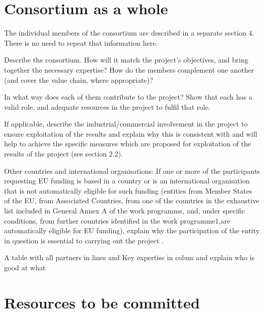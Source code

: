 

\section{Consortium as a whole}\label{sec:consortium}

\begin{todo}{}\color{red}

  The individual members of the consortium are described in a separate
  section 4. There is no need to repeat that information here.

  Describe the consortium. How will it match the project’s objectives, and bring together the necessary expertise? How do the members complement one another (and cover the value chain, where appropriate)? 

  In what way does each of them contribute to the project? Show that each has a valid role, and adequate resources in the project to fulfil that role. 

  If applicable, describe the industrial/commercial involvement in the project to ensure exploitation of the results and explain why this is consistent with and will help to achieve the specific measures which are proposed for exploitation of the results of the project (see section 2.2). 

  Other countries and international organisations: If one or more of the participants requesting EU funding is based in a country or is an international organisation that is not automatically eligible for such funding (entities from Member States of the EU, from Associated Countries, from one of the countries in the exhaustive list included in General Annex A of the work programme, and, under specific conditions, from further countries identified in the work programme1,are automatically eligible for EU funding), explain why the participation of the entity in question is essential to carrying out the project .
\end{todo}



{\color{red} A table with all partners in lines and Key expertise in colum
  and explain who is good at what}

\section{Resources to be committed}\label{sec:resources}

